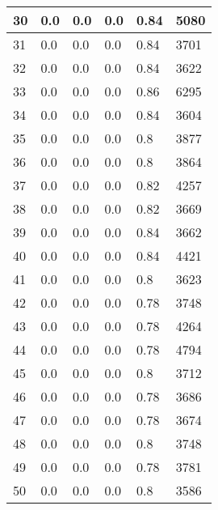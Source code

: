\begin{longtable}{|l|l|l|l|l|l|}
30 & 0.0 & 0.0 & 0.0 & 0.84 & 5080 \\ \hline 
31 & 0.0 & 0.0 & 0.0 & 0.84 & 3701 \\ \hline 
32 & 0.0 & 0.0 & 0.0 & 0.84 & 3622 \\ \hline 
33 & 0.0 & 0.0 & 0.0 & 0.86 & 6295 \\ \hline 
34 & 0.0 & 0.0 & 0.0 & 0.84 & 3604 \\ \hline 
35 & 0.0 & 0.0 & 0.0 & 0.8 & 3877 \\ \hline 
36 & 0.0 & 0.0 & 0.0 & 0.8 & 3864 \\ \hline 
37 & 0.0 & 0.0 & 0.0 & 0.82 & 4257 \\ \hline 
38 & 0.0 & 0.0 & 0.0 & 0.82 & 3669 \\ \hline 
39 & 0.0 & 0.0 & 0.0 & 0.84 & 3662 \\ \hline 
40 & 0.0 & 0.0 & 0.0 & 0.84 & 4421 \\ \hline 
41 & 0.0 & 0.0 & 0.0 & 0.8 & 3623 \\ \hline 
42 & 0.0 & 0.0 & 0.0 & 0.78 & 3748 \\ \hline 
43 & 0.0 & 0.0 & 0.0 & 0.78 & 4264 \\ \hline 
44 & 0.0 & 0.0 & 0.0 & 0.78 & 4794 \\ \hline 
45 & 0.0 & 0.0 & 0.0 & 0.8 & 3712 \\ \hline 
46 & 0.0 & 0.0 & 0.0 & 0.78 & 3686 \\ \hline 
47 & 0.0 & 0.0 & 0.0 & 0.78 & 3674 \\ \hline 
48 & 0.0 & 0.0 & 0.0 & 0.8 & 3748 \\ \hline 
49 & 0.0 & 0.0 & 0.0 & 0.78 & 3781 \\ \hline 
50 & 0.0 & 0.0 & 0.0 & 0.8 & 3586 \\ \hline 
\end{longtable}